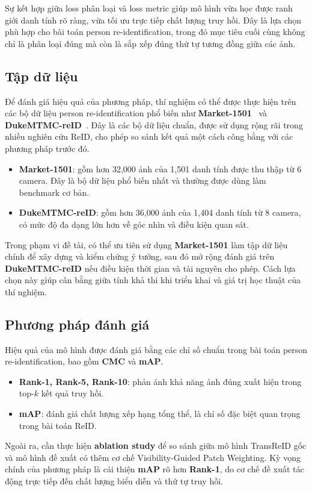 Sự kết hợp giữa loss phân loại và loss metric giúp mô hình vừa học được ranh giới danh tính rõ ràng, vừa tối ưu trực tiếp chất lượng truy hồi. Đây là lựa chọn phù hợp cho bài toán person re-identification, trong đó mục tiêu cuối cùng không chỉ là phân loại đúng mà còn là sắp xếp đúng thứ tự tương đồng giữa các ảnh.

\subsection{Tập dữ liệu}
Để đánh giá hiệu quả của phương pháp, thí nghiệm có thể được thực hiện trên các bộ dữ liệu person re-identification phổ biến như \textbf{Market-1501}~\cite{zheng2015market1501} và \textbf{DukeMTMC-reID}~\cite{gou2017dukemtmc4reid}. Đây là các bộ dữ liệu chuẩn, được sử dụng rộng rãi trong nhiều nghiên cứu ReID, cho phép so sánh kết quả một cách công bằng với các phương pháp trước đó.

\begin{itemize}
    \item \textbf{Market-1501}: gồm hơn 32,000 ảnh của 1,501 danh tính được thu thập từ 6 camera. Đây là bộ dữ liệu phổ biến nhất và thường được dùng làm benchmark cơ bản.
    \item \textbf{DukeMTMC-reID}: gồm hơn 36,000 ảnh của 1,404 danh tính từ 8 camera, có mức độ đa dạng lớn hơn về góc nhìn và điều kiện quan sát.
\end{itemize}

Trong phạm vi đề tài, có thể ưu tiên sử dụng \textbf{Market-1501} làm tập dữ liệu chính để xây dựng và kiểm chứng ý tưởng, sau đó mở rộng đánh giá trên \textbf{DukeMTMC-reID} nếu điều kiện thời gian và tài nguyên cho phép. Cách lựa chọn này giúp cân bằng giữa tính khả thi khi triển khai và giá trị học thuật của thí nghiệm.

\subsection{Phương pháp đánh giá}

Hiệu quả của mô hình được đánh giá bằng các chỉ số chuẩn trong bài toán person re-identification, bao gồm \textbf{CMC} và \textbf{mAP}.

\begin{itemize}
    \item \textbf{Rank-1, Rank-5, Rank-10}: phản ánh khả năng ảnh đúng xuất hiện trong top-\(k\) kết quả truy hồi.
    \item \textbf{mAP}: đánh giá chất lượng xếp hạng tổng thể, là chỉ số đặc biệt quan trọng trong bài toán ReID.
\end{itemize}

Ngoài ra, cần thực hiện \textbf{ablation study} để so sánh giữa mô hình TransReID gốc và mô hình đề xuất có thêm cơ chế Visibility-Guided Patch Weighting. Kỳ vọng chính của phương pháp là cải thiện \textbf{mAP} rõ hơn \textbf{Rank-1}, do cơ chế đề xuất tác động trực tiếp đến chất lượng biểu diễn và thứ tự truy hồi.
